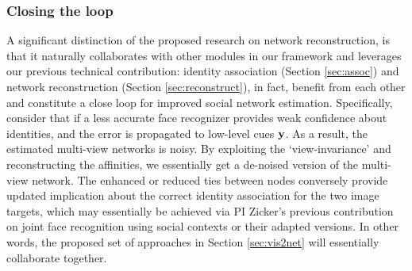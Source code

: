 
\subsubsection{Closing the loop}
\label{sec:closeloop}

A significant distinction of the proposed research on network reconstruction, is that it naturally collaborates with other modules in our framework and leverages our previous technical contribution: identity association (Section \ref{sec:assoc}) and network reconstruction (Section \ref{sec:reconstruct}), in fact, benefit from each other and constitute a close loop for improved social network estimation. Specifically, consider that if a less accurate face recognizer provides weak confidence about identities, and the error is propagated to low-level cues ${\bf y}$. As a result, the estimated multi-view networks is noisy. By exploiting the `view-invariance' and reconstructing the affinities, we essentially get a de-noised version of the multi-view network. The enhanced or reduced ties between nodes conversely provide updated implication about the correct identity association for the two image targets, which may essentially be achieved via PI Zicker's previous contribution on joint face recognition using social contexts \cite{Stone2008,Stone2010} or their adapted versions. In other words, the proposed set of approaches in Section \ref{sec:vis2net} will essentially collaborate together.